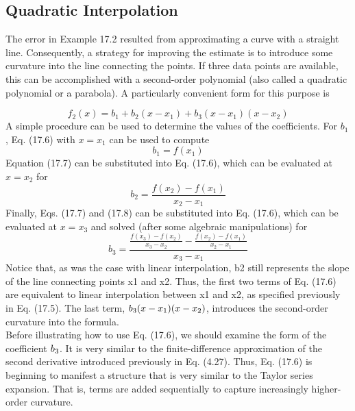 \documentclass[../main.tex]{subfiles}
\begin{document}
\subsection{Quadratic Interpolation}
The error in Example 17.2 resulted from approximating a curve with a straight line. Consequently, a strategy for improving the estimate is to introduce some curvature into the line
connecting the points. If three data points are available, this can be accomplished with a
second-order polynomial (also called a quadratic polynomial or a parabola). A particularly
convenient form for this purpose is

\begin{equation}
    \tag{17.6}
    f_{2}(x)=b_{1}+b_{2}\left(x-x_{1}\right)+b_{3}\left(x-x_{1}\right)\left(x-x_{2}\right)
\end{equation}
A simple procedure can be used to determine the values of the coefficients. For $b_{1}$, Eq. (17.6) with $x=x_{1}$ can be used to compute
\begin{equation}
    \tag{17.7}
b_{1}=f\left(x_{1}\right)
\end{equation}
Equation (17.7) can be substituted into Eq. (17.6), which can be evaluated at $x=x_{2}$ for
\begin{equation}
    \tag{17.8}
b_{2}=\frac{f\left(x_{2}\right)-f\left(x_{1}\right)}{x_{2}-x_{1}}
\end{equation}
Finally, Eqs. (17.7) and (17.8) can be substituted into Eq. (17.6), which can be evaluated at $x=x_{3}$ and solved (after some algebraic manipulations) for
\begin{equation}
    \tag{17.9}
b_{3}=\frac{\frac{f\left(x_{3}\right)-f\left(x_{2}\right)}{x_{3}-x_{2}}-\frac{f\left(x_{2}\right)-f\left(x_{1}\right)}{x_{2}-x_{1}}}{x_{3}-x_{1}}
\end{equation}
Notice that, as was the case with linear interpolation, b2 still represents the slope of the
line connecting points x1 and x2. Thus, the first two terms of Eq. (17.6) are equivalent to
linear interpolation between x1 and x2, as specified previously in Eq. (17.5). The last term,
$b\textsubscript{3}(x - x\textsubscript{1})(x - x\textsubscript{2})$, introduces the second-order curvature into the formula.\\
Before illustrating how to use Eq. (17.6), we should examine the form of the coefficient $b\textsubscript{3}$. It is very similar to the finite-difference approximation of the second derivative
introduced previously in Eq. (4.27). Thus, Eq. (17.6) is beginning to manifest a structure
that is very similar to the Taylor series expansion. That is, terms are added sequentially to
capture increasingly higher-order curvature. 
\end{document}
